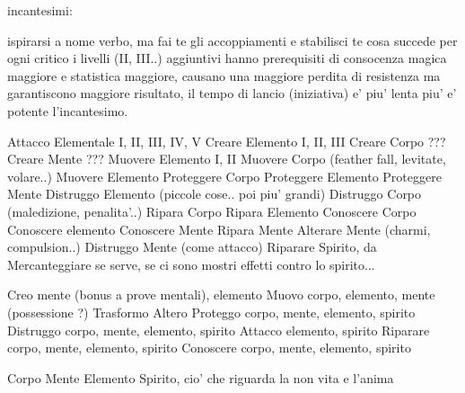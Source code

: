 \documentclass[12pt,a4paper,twoside,openany]{book}
\begin{document}
incantesimi:

ispirarsi a nome verbo, ma fai te gli accoppiamenti e stabilisci te cosa succede per ogni critico 
i livelli (II, III..) aggiuntivi hanno prerequisiti di consocenza magica maggiore e statistica maggiore, causano una maggiore perdita di resistenza ma garantiscono maggiore risultato, il tempo di lancio (iniziativa) e' piu' lenta piu' e' potente l'incantesimo.

Attacco Elementale I, II, III, IV, V
Creare Elemento I, II, III
Creare Corpo  ???
Creare Mente  ???
Muovere Elemento I, II
Muovere Corpo (feather fall, levitate, volare..)
Muovere Elemento
Proteggere Corpo
Proteggere Elemento 
Proteggere Mente
Distruggo Elemento (piccole cose.. poi piu' grandi)
Distruggo Corpo (maledizione, penalita'..)
Ripara Corpo
Ripara Elemento
Conoscere Corpo
Conoscere elemento
Conoscere Mente
Ripara Mente
Alterare Mente (charmi, compulsion..)
Distruggo Mente (come attacco)
Riparare Spirito, da Mercanteggiare se serve, se ci sono mostri effetti contro lo spirito...


Creo		mente (bonus a prove mentali), elemento
Muovo		corpo, elemento, mente (possessione ?)
Trasformo	
Altero
Proteggo	corpo, mente, elemento, spirito
Distruggo	corpo, mente, elemento, spirito
Attacco		elemento, spirito
Riparare	corpo, mente, elemento, spirito
Conoscere	corpo, mente, elemento, spirito

Corpo
Mente
Elemento
Spirito, cio' che riguarda la non vita e l'anima
\end{document}
